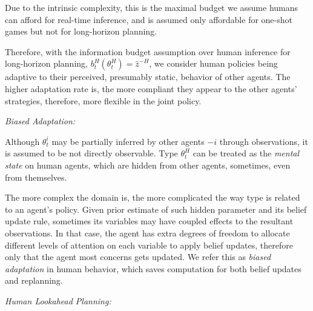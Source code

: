 \documentclass[letterpaper, 10 pt, conference]{ieeeconf}  %
\begin{document}
\begin{itemize}
    Due to the intrinsic complexity, this is the maximal budget we assume 
    humans can afford for real-time inference, and is assumed only 
    affordable for one-shot games but not for long-horizon planning. 
\end{itemize}

Therefore, with the information budget assumption over human inference for long-horizon 
planning, $b^H_t(\theta^H_t) = \hat{z}^{-H}$, we consider human policies 
being adaptive to their perceived, presumably static, behavior of other 
agents. The higher adaptation rate is, the more compliant they 
appear to the other agents' strategies, therefore, more flexible in the joint policy. 

\textit{Biased Adaptation:}

Although $\theta^i_t$ may be partially inferred by other agents $-i$ through 
observations, it is assumed to be not directly observable. 
Type $\theta^H_t$ can be treated as 
the \textit{mental state} on human agents, which are 
hidden from other agents, sometimes, even from themselves.  

The more complex the domain is, the more complicated the way type is related 
to an agent's policy. Given prior estimate of such hidden parameter and its 
belief update rule, sometimes its variables may have coupled effects to the 
resultant observations. In that case, the agent has extra degrees of freedom to 
allocate different levels of attention on 
each variable to apply belief updates, therefore only that the 
agent most concerns gets updated. We refer this as \textit{biased adaptation} in human 
behavior, which saves computation for both belief updates and replanning.  

\textit{Human Lookahead Planning:}
\end{document}
